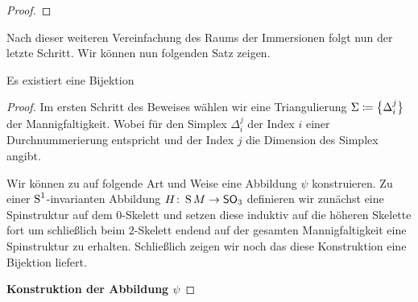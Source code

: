 \begin{Lem}
\begin{proof}
		
		
	\end{proof}
	
\end{Lem}

Nach dieser weiteren Vereinfachung des Raums der Immersionen folgt nun
der letzte Schritt. Wir können nun folgenden Satz zeigen.



\begin{Satz}
	Es existiert eine Bijektion
	\begin{center}
	\end{center}
	\begin{proof}
          Im ersten Schritt des Beweises wählen wir eine
          Triangulierung $\Sigma \coloneqq \sset{ \Delta_i^j}$ der
          Mannigfaltigkeit. Wobei für den Simplex $\Delta_i^j$ der
          Index $i$ einer Durchnummerierung entspricht und der Index
          $j$ die Dimension des Simplex angibt.  
		
          Wir können zu auf folgende Art und Weise eine Abbildung
          $\psi$ konstruieren.  Zu einer $\S^1$-invarianten Abbildung
          $\abb{H}{\S M}{\so_3}$ definieren wir zunächst eine
          Spinstruktur auf dem $0$-Skelett und setzen diese induktiv
          auf die höheren Skelette fort um schließlich beim
          $2$-Skelett endend auf der gesamten Mannigfaltigkeit eine
          Spinstruktur zu erhalten. Schließlich zeigen wir noch das
          diese Konstruktion eine Bijektion liefert.
		
          \textbf{Konstruktion der Abbildung $\psi$}
		

\end{proof}
\end{Satz}
